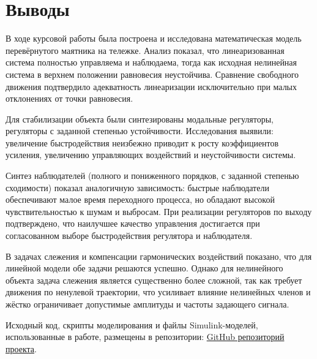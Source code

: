 \documentclass[a4paper,12pt]{article}
\begin{document}
	\newpage
	\section{Выводы}
	
	В ходе курсовой работы была построена и исследована математическая модель перевёрнутого маятника на тележке. Анализ показал, что линеаризованная система полностью управляема и наблюдаема, тогда как исходная нелинейная система в верхнем положении равновесия неустойчива. Сравнение свободного движения подтвердило адекватность линеаризации исключительно при малых отклонениях от точки равновесия.
	
	Для стабилизации объекта были синтезированы модальные регуляторы, регуляторы с заданной степенью устойчивости. Исследования выявили: увеличение быстродействия неизбежно приводит к росту коэффициентов усиления, увеличению управляющих воздействий и неустойчивости системы. 
	
	Синтез наблюдателей (полного и пониженного порядков, с заданной степенью сходимости) показал аналогичную зависимость: быстрые наблюдатели обеспечивают малое время переходного процесса, но обладают высокой чувствительностью к шумам и выбросам. При реализации регуляторов по выходу подтверждено, что наилучшее качество управления достигается при согласованном выборе быстродействия регулятора и наблюдателя.
	
	В задачах слежения и компенсации гармонических воздействий показано, что для линейной модели обе задачи решаются успешно. Однако для нелинейного объекта задача слежения является существенно более сложной, так как требует движения по ненулевой траектории, что усиливает влияние нелинейных членов и жёстко ограничивает допустимые амплитуды и частоты задающего сигнала.
	
	Исходный код, скрипты моделирования и файлы Simulink-моделей, использованные в работе, размещены в репозитории: \href{https://github.com/decadeos/ITMO/tree/master/3_course/TAU/CP}{GitHub репозиторий проекта}.
	
\end{document}
